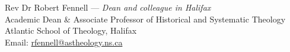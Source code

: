 \documentclass[11pt]{article}
\begin{document}


Rev Dr Robert Fennell --- \emph{Dean and colleague in Halifax}\\
Academic Dean \& Associate Professor of Historical and Systematic Theology\\
Atlantic School of Theology, Halifax\\
Email: \href{mailto:rfennell@astheology.ns.ca}{rfennell@astheology.ns.ca}


\end{document}
